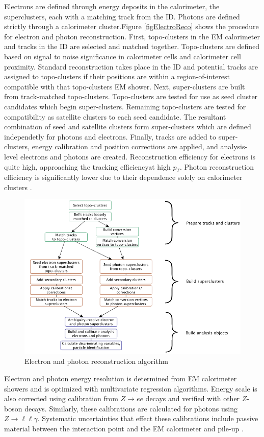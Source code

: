 Electrons are defined through energy deposits in the calorimeter, the superclusters, each with a matching track from the ID. Photons are defined strictly through a calorimeter cluster.Figure \ref{figElectroReco} shows the procedure for electron and photon reconstruction. First, topo-clusters in the EM calorimeter and tracks in the ID are selected and matched together. Topo-clusters are defined based on signal to noise significance in calorimeter cells and calorimeter cell proximity. Standard reconstruction takes place in the ID and potential tracks are assigned to topo-clusters if their positions are within a region-of-interest compatible with that topo-clusters EM shower. Next, super-clusters are built from track-matched topo-clusters. Topo-clusters are tested for use as seed cluster candidates which begin super-clusters. Remaining topo-clusters are tested for compatibility as satellite clusters to each seed candidate. The resultant combination of seed and satellite clusters form super-clusters which are defined independetly for photons and electrons.  Finally, tracks are added to super-clusters, energy calibration and position corrections are applied, and analysis-level electrons and photons are created. Reconstruction efficiency for electrons is quite high, approaching the tracking efficiencyat high $p_T$. Photon reconstruction efficiency is significantly lower due to their dependence solely on calorimeter clusters \cite{ElectronPhotonPerformance}. 

\begin{figure}[!h]
        \centering
    \includegraphics[width=.6\textwidth]{Pictures/ElectroReco.png}
    \caption{ Electron and photon reconstruction algorithm \cite{ElectronPhotonPerformance}}
    \label{fig:ElectroReco}
\end{figure}
 
Electron and photon energy resolution is determined from EM calorimeter showers and is optimized with multivariate regression algorithms. Energy scale is also corrected using calibration from $Z\rightarrow ee$ decays and verified with other $Z$-boson decays. Similarly, these calibrations are calculated for photons using $Z\rightarrow \ell\ell\gamma$. Systematic uncertainties that effect these calibrations include passive material between the interaction point and the EM calorimeter and pile-up \cite{ElectronPhotonPerformance}. 

